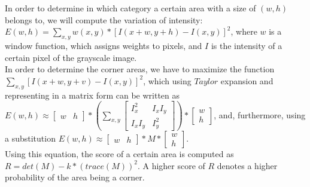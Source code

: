 In order to determine in which category a certain area with a size of $(w, h)$ belongs to, we will compute the variation of intensity: $E(w, h) = \sum_{x, y} w(x, y) * [I(x + w, y + h) - I(x, y)]^2$, where $w$ is a window function, which assigns weights to pixels, and $I$ is the intensity of a certain pixel of the grayscale image.\\
In order to determine the corner areas, we have to maximize the function $\sum_{x, y}[I(x + w, y + v) - I(x, y)]^2$, which using $Taylor$ expansion and representing in a matrix form can be written as
$E(w, h) \approx
\begin{bmatrix}
w & h
\end{bmatrix} * 
\left(\sum_{x, y}
\begin{bmatrix}
I_x^2 & I_xI_y\\
I_xI_y & I_y^2
\end{bmatrix}
\right) *
\begin{bmatrix}
w \\
h
\end{bmatrix}$, and, furthermore, using a substitution
$E(w, h) \approx
\begin{bmatrix}
w & h
\end{bmatrix} * 
M *
\begin{bmatrix}
w \\
h
\end{bmatrix}$.\\
Using this equation, the score of a certain area is computed as $R = det(M) - k * (trace(M))^2$. A higher score of $R$ denotes a higher probability of the area being a corner.

